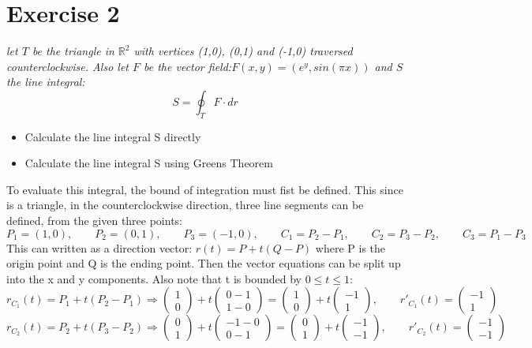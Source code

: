 \section{Exercise 2}
\textit{let $T$ be the triangle in $\mathbb{R}^2$ with vertices (1,0), (0,1) and (-1,0) traversed 
counterclockwise. Also let $F$ be the vector field:$F(x,y) = (e^y, sin(\pi x))$ and $S$ the line integral:}
\[S = \oint_T F \cdot dr\]
\begin{itemize}
    \item Calculate the line integral S directly
    \item Calculate the line integral S using Greens Theorem
\end{itemize}

To evaluate this integral, the bound of integration must fist be defined.
This since is a triangle, in the counterclockwise direction, three line segments can be defined, 
from the given three points:
\[P_1=(1,0),\qquad P_2=(0,1),\qquad P_3=(-1,0),\qquad
C_1 = P_2 - P_1, \qquad C_2 = P_3-P_2, \qquad C_3 = P_1-P_3\]
This can written as a direction vector: $r(t) = P+t(Q-P)$ where P is the origin 
point and Q is the ending point. Then the vector equations can be split up into
the x and y components. Also note that t is bounded by $0\le t \le 1$:
\[
r_{C_1}(t) = P_1 +t(P_2 - P_1) \Rightarrow 
\begin{pmatrix} 
    1\\
    0 
\end{pmatrix}
+t
\begin{pmatrix}
    0-1\\
    1-0
\end{pmatrix} 
= 
\begin{pmatrix} 
    1\\
    0 
\end{pmatrix}+
t
\begin{pmatrix}
    -1\\
    1
\end{pmatrix},
\qquad r'_{C_1}(t) =
\begin{pmatrix}
    -1\\
    1
\end{pmatrix}
\]
\[
r_{C_2}(t) = P_2 +t(P_3 - P_2) \Rightarrow 
\begin{pmatrix} 
    0\\
    1 
\end{pmatrix}
+t
\begin{pmatrix}
    -1-0\\
    0-1
\end{pmatrix} 
= 
\begin{pmatrix} 
    0\\
    1 
\end{pmatrix}+
t
\begin{pmatrix}
    -1\\
    -1
\end{pmatrix},
\qquad r'_{C_2}(t) = 
\begin{pmatrix}
    -1\\
    -1
\end{pmatrix}
\]
